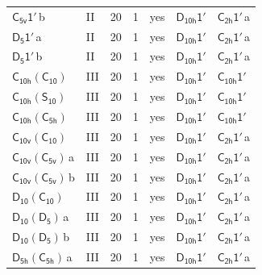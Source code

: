 \documentclass[10pt,a4paper]{article}
\numberwithin{equation}{section}
\newcommand{\grp}[1]{\mathsf{#1}}
\newcommand{\clsletter}[1]{\,{\scriptsize\color{black!55}#1}}
\begin{document}
{\begin{longtable}{@{}llrrlll@{}}
\href{C5v-1p.pdf}{$\grp{C_{5v}1'}$}\clsletter{b} & II & 20 & 1 & yes & \href{D10h-1p.pdf}{$\grp{D_{10h}1'}$} & \href{C2h-1p.pdf}{$\grp{C_{2h}1'}$}\clsletter{a}\\
\href{D5-1p.pdf}{$\grp{D_{5}1'}$}\clsletter{a} & II & 20 & 1 & yes & \href{D10h-1p.pdf}{$\grp{D_{10h}1'}$} & \href{C2h-1p.pdf}{$\grp{C_{2h}1'}$}\clsletter{a}\\
\href{D5-1p.pdf}{$\grp{D_{5}1'}$}\clsletter{b} & II & 20 & 1 & yes & \href{D10h-1p.pdf}{$\grp{D_{10h}1'}$} & \href{C2h-1p.pdf}{$\grp{C_{2h}1'}$}\clsletter{a}\\
\href{C10h-C10.pdf}{$\grp{C_{10h}}(\grp{C_{10}})$} & III & 20 & 1 & yes & \href{D10h-1p.pdf}{$\grp{D_{10h}1'}$} & \href{C10h-1p.pdf}{$\grp{C_{10h}1'}$}\\
\href{C10h-S10.pdf}{$\grp{C_{10h}}(\grp{S_{10}})$} & III & 20 & 1 & yes & \href{D10h-1p.pdf}{$\grp{D_{10h}1'}$} & \href{C10h-1p.pdf}{$\grp{C_{10h}1'}$}\\
\href{C10h-C5h.pdf}{$\grp{C_{10h}}(\grp{C_{5h}})$} & III & 20 & 1 & yes & \href{D10h-1p.pdf}{$\grp{D_{10h}1'}$} & \href{C10h-1p.pdf}{$\grp{C_{10h}1'}$}\\
\href{C10v-C10.pdf}{$\grp{C_{10v}}(\grp{C_{10}})$} & III & 20 & 1 & yes & \href{D10h-1p.pdf}{$\grp{D_{10h}1'}$} & \href{C2h-1p.pdf}{$\grp{C_{2h}1'}$}\clsletter{a}\\
\href{C10v-C5v.pdf}{$\grp{C_{10v}}(\grp{C_{5v}})$}\clsletter{a} & III & 20 & 1 & yes & \href{D10h-1p.pdf}{$\grp{D_{10h}1'}$} & \href{C2h-1p.pdf}{$\grp{C_{2h}1'}$}\clsletter{a}\\
\href{C10v-C5v.pdf}{$\grp{C_{10v}}(\grp{C_{5v}})$}\clsletter{b} & III & 20 & 1 & yes & \href{D10h-1p.pdf}{$\grp{D_{10h}1'}$} & \href{C2h-1p.pdf}{$\grp{C_{2h}1'}$}\clsletter{a}\\
\href{D10-C10.pdf}{$\grp{D_{10}}(\grp{C_{10}})$} & III & 20 & 1 & yes & \href{D10h-1p.pdf}{$\grp{D_{10h}1'}$} & \href{C2h-1p.pdf}{$\grp{C_{2h}1'}$}\clsletter{a}\\
\href{D10-D5.pdf}{$\grp{D_{10}}(\grp{D_{5}})$}\clsletter{a} & III & 20 & 1 & yes & \href{D10h-1p.pdf}{$\grp{D_{10h}1'}$} & \href{C2h-1p.pdf}{$\grp{C_{2h}1'}$}\clsletter{a}\\
\href{D10-D5.pdf}{$\grp{D_{10}}(\grp{D_{5}})$}\clsletter{b} & III & 20 & 1 & yes & \href{D10h-1p.pdf}{$\grp{D_{10h}1'}$} & \href{C2h-1p.pdf}{$\grp{C_{2h}1'}$}\clsletter{a}\\
\href{D5h-C5h.pdf}{$\grp{D_{5h}}(\grp{C_{5h}})$}\clsletter{a} & III & 20 & 1 & yes & \href{D10h-1p.pdf}{$\grp{D_{10h}1'}$} & \href{C2h-1p.pdf}{$\grp{C_{2h}1'}$}\clsletter{a}\\

\end{longtable}}
\end{document}
